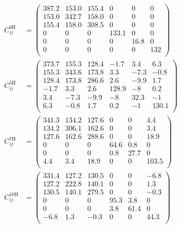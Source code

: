 \begin{align*}
C_{ij}^{\text{0H}} &= \begin{pmatrix}
387.2 & 153.0 & 155.4 & 0     & 0    & 0 \\
153.0 & 342.7 & 158.0 & 0     & 0    & 0 \\
155.4 & 158.0 & 308.5 & 0     & 0    & 0 \\
0     & 0     & 0     & 133.1 & 0    & 0 \\
0     & 0     & 0     & 0     & 16.8 & 0 \\
0     & 0     & 0     & 0     & 0    & 132 \\
\end{pmatrix} \\
C_{ij}^{\text{5H}} &= \begin{pmatrix}
373.7 & 155.3 & 128.4 & -1.7 & 3.4 & 6.3 \\
155.3 & 343.6 & 173.8 & 3.3 & -7.3 & -0.8 \\
128.4 & 173.8 & 286.6 & 2.6 & -9.9 & 1.7 \\
-1.7  & 3.3   & 2.6   & 128.9 & -8 & 0.2 \\
3.4   & -7.3  & -9.9  & -8 & 32.3 & -1 \\
6.3   & -0.8  & 1.7   & 0.2 & -1 & 130.1 \\
\end{pmatrix} \\
C_{ij}^{\text{7H}} &= \begin{pmatrix}
341.3 & 134.2 & 127.6 & 0 & 0 & 4.4 \\
134.2 & 306.1 & 162.6 & 0 & 0 & 3.4 \\
127.6 & 162.6 & 288.6 & 0 & 0 & 18.9 \\
0 & 0 & 0 & 64.6 & 0.8 & 0 \\
0 & 0 & 0 & 0.8 & 27.7 & 0 \\
4.4 & 3.4 & 18.9 & 0 & 0 & 103.5 \\
\end{pmatrix} \\
C_{ij}^{\text{10H}} &= \begin{pmatrix}
331.4 & 127.2 & 130.5 & 0 & 0 & -6.8 \\
127.2 & 222.8 & 140.1 & 0 & 0 & 1.3 \\
130.5 & 140.1 & 279.5 & 0 & 0 & -0.3 \\
0 & 0 & 0 & 95.3 & 3.8 & 0 \\
0 & 0 & 0 & 3.8 & 61.4 & 0 \\
-6.8 & 1.3 & -0.3 & 0 & 0 & 44.3 \\
\end{pmatrix}
\end{align*}





